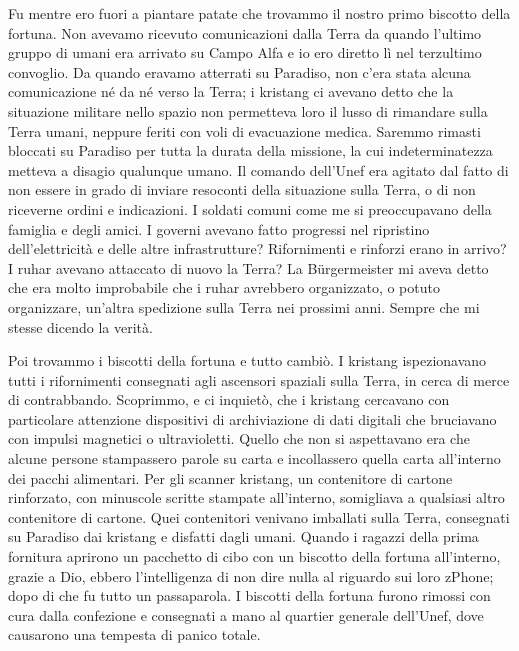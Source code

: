 Fu mentre ero fuori a piantare patate che trovammo il nostro primo
biscotto della fortuna. Non avevamo ricevuto comunicazioni dalla Terra
da quando l'ultimo gruppo di umani era arrivato su Campo Alfa e io ero
diretto lì nel terzultimo convoglio. Da quando eravamo atterrati su
Paradiso, non c'era stata alcuna comunicazione né da né verso la Terra;
i kristang ci avevano detto che la situazione militare nello spazio non
permetteva loro il lusso di rimandare sulla Terra umani, neppure feriti
con voli di evacuazione medica. Saremmo rimasti bloccati su Paradiso per
tutta la durata della missione, la cui indeterminatezza metteva a
disagio qualunque umano. Il comando dell'Unef era agitato dal fatto di
non essere in grado di inviare resoconti della situazione sulla Terra, o
di non riceverne ordini e indicazioni. I soldati comuni come me si
preoccupavano della famiglia e degli amici. I governi avevano fatto
progressi nel ripristino dell'elettricità e delle altre infrastrutture?
Rifornimenti e rinforzi erano in arrivo? I ruhar avevano attaccato di
nuovo la Terra? La Bürgermeister mi aveva detto che era molto
improbabile che i ruhar avrebbero organizzato, o potuto organizzare,
un'altra spedizione sulla Terra nei prossimi anni. Sempre che mi stesse
dicendo la verità.

Poi trovammo i biscotti della fortuna e tutto cambiò. I kristang
ispezionavano tutti i rifornimenti consegnati agli ascensori spaziali
sulla Terra, in cerca di merce di contrabbando. Scoprimmo, e ci
inquietò, che i kristang cercavano con particolare attenzione
dispositivi di archiviazione di dati digitali che bruciavano con impulsi
magnetici o ultravioletti. Quello che non si aspettavano era che alcune
persone stampassero parole su carta e incollassero quella carta
all'interno dei pacchi alimentari. Per gli scanner kristang, un
contenitore di cartone rinforzato, con minuscole scritte stampate
all'interno, somigliava a qualsiasi altro contenitore di cartone. Quei
contenitori venivano imballati sulla Terra, consegnati su Paradiso dai
kristang e disfatti dagli umani. Quando i ragazzi della prima fornitura
aprirono un pacchetto di cibo con un biscotto della fortuna all'interno,
grazie a Dio, ebbero l'intelligenza di non dire nulla al riguardo sui
loro zPhone; dopo di che fu tutto un passaparola. I biscotti della
fortuna furono rimossi con cura dalla confezione e consegnati a mano al
quartier generale dell'Unef, dove causarono una tempesta di panico
totale.


